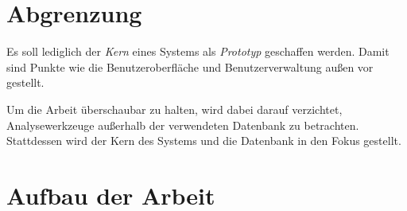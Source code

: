 \section{Abgrenzung}

Es soll lediglich der \emph{Kern} eines Systems als \emph{Prototyp} geschaffen werden.
Damit sind Punkte wie die Benutzeroberfläche und Benutzerverwaltung
außen vor gestellt.

Um die Arbeit überschaubar zu halten, wird dabei darauf verzichtet, Analysewerkzeuge außerhalb der verwendeten Datenbank zu betrachten.
Stattdessen wird der Kern des Systems und die Datenbank in den Fokus gestellt.


\section{Aufbau der Arbeit}

